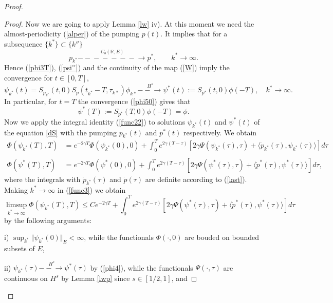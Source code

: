 \documentclass[11pt]{article}
\newcommand{\R}{{\mathbb R}}
\newcommand{\st}{\stackrel}
\newcommand{\toHs}{\st{H^s}{-\!\!\!-\!\!\!\to}}
\newcommand{\toCbE }{\st{C_b(\R,E)}{-\!\!\!-\!\!\!-\!\!\!-\!\!\!-\!\!\!-\!\!\!-\!\!\!\to}}
\newcommand{\ga}{\gamma}
\newcommand{\5}{{\hspace{0.5mm}}}
\numberwithin{equation}{section}
\newcommand{\la}{\label}
\newcommand{\be}{\begin{equation}}
\newcommand{\ee}{\end{equation}}
\numberwithin{equation}{section}
\begin{document}
\begin{proof}
\begin{proof}
Now we are going to apply Lemma \ref{lw} iv). At this moment we need the almost-periodicity (\ref{alper}) of the pumping $p(t)$.
 It implies that for a subsequence $\{k^*\}\subset\{k''\}$
\be\la{alm}
p_{k^*} \toCbE p^*,\qquad k^*\to\infty.
\ee
Hence (\ref{phi3T}), (\ref{psi''}) and the continuity
of the map (\ref{W})
 imply the convergence
for $t\in[0,T]$,
\be\la{phi4}
\psi_{k^*}(t)=S_{p_{k^*}} (t,0)S_p(t_{k^*}-T,\tau_{k*})\phi_{k*}\toHs\psi^*(t):=S_{p^*}(t,0)\phi(-T),\quad k^*\to\infty.
\ee
In particular, for $t=T$
the convergence (\ref{phi50})
gives that
\be\la{phi5}
\psi^*(T):=S_{p^*}(T,0)\phi(-T)=\phi.
\ee
Now we apply the integral identity
 (\ref{func22}) to solutions $\psi_{k^*}(t)$ and $\psi^*(t)$
of the equation \eqref{dS} with the pumping $p_{k^*}(t)$ and $p^*(t)$ respectively.
We obtain
\begin{align}\la{func3}
\Phi(\psi_{k^*}(T),T)&=e^{-2\ga T}\Phi(\psi_{k^*}(0),0)+\int_0^T e^{2\ga (T-\tau)}[2\ga\Psi(\psi_{k^*}(\tau),\tau)+
\langle \dot p_{k^*}(\tau),\psi_{k^*}(\tau) \rangle]d\tau
\\
\nonumber\\
\la{func4}
\Phi(\psi^*(T),T)&=e^{-2\ga T}\Phi(\psi^*(0),0)+\int_0^T e^{2\ga (T-\tau)}[2\ga\Psi(\psi^*(\tau),\tau)+
\langle \dot p^*(\tau),\psi^*(\tau) \rangle]d\tau,
\end{align}
where the integrals with
 $\dot p_{k^*}(\tau)$ and $\dot p(\tau)$ are definite according to (\ref{last}).
Making $k^*\to\infty$ in (\ref{func3}) we obtain
\be\la{func5}
\limsup_{k^*\to\infty} \Phi(\psi_{k^*}(T),T)\le C e^{-2\ga T}+\int_0^T e^{2\ga (T-\tau)}[2\ga\Psi(\psi^*(\tau),\tau)+
\langle \dot p^*(\tau),\psi^*(\tau) \rangle]d\tau
\ee
by the following arguments:
\smallskip

i) $\sup_{k^*}\Vert\psi_{k^*}(0)\Vert_E<\infty$, while the functionals $\Phi(\cdot,0)$ are
bouded on bounded subsets of $E$,
\smallskip

ii) $\psi_{k^*}(\tau)\toHs \psi^*(\tau)$ by (\ref{phi4}), while the functionals $\Psi(\cdot,\tau)$ are continuous
on $H^s$ by Lemma \ref{lwp} since $s\in[1/2,1]$,
 and
 \smallskip


\end{proof}
\end{proof}
\end{document}
